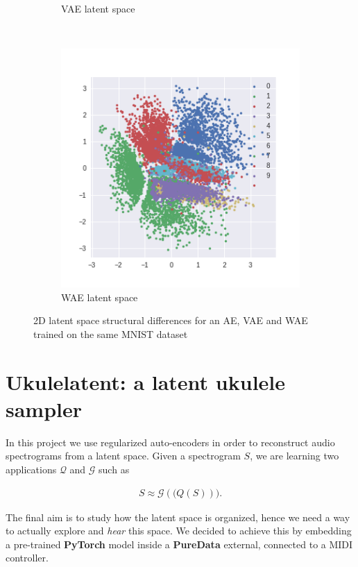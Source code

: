 \documentclass[11pt, english]{article}
\begin{document}
\begin{figure}[h!]
{{\begin{subfigure}[t]{.35\linewidth}
    \caption{VAE latent space}
    \end{subfigure}
    ~
    \begin{subfigure}[t]{.35\linewidth}
    \centering \includegraphics[width=\linewidth]{img/WAE_Z.png}
    \caption{WAE latent space}
    \end{subfigure}
    }}
    \caption{2D latent space structural differences for an AE, VAE and WAE trained on the same MNIST dataset}\label{fig:latentspaceorg}
    
\end{figure}

\newpage

\section{Ukulelatent: a latent ukulele sampler}

In this project we use regularized auto-encoders in order to reconstruct audio spectrograms from a latent space. Given a spectrogram $S$, we are learning two applications $\mathcal Q$ and $\mathcal G$ such as 

\begin{align}
S \approx \mathcal G(\mathcal(Q(S))).
\label{S_expression}
\end{align}
 
The final aim is to study how the latent space is organized, hence we need a way to actually explore and \textit{hear} this space. We decided to achieve this by embedding a pre-trained \textbf{PyTorch} model inside a \textbf{PureData} external, connected to a MIDI controller.\\
\end{document}
